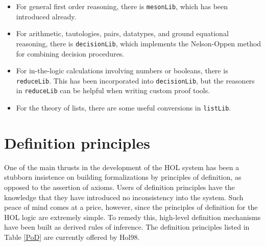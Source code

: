 \documentclass[12pt,fleqn,a4paper]{report}
\begin{document}
\begin{itemize}

\item For general first order reasoning, there is \verb+mesonLib+, which
      has been introduced already.

\item For arithmetic, tautologies, pairs, datatypes, and ground
      equational reasoning, there is \verb+decisionLib+, which
      implements the Nelson-Oppen method for combining decision procedures.

\item For in-the-logic calculations involving numbers or booleans, there
      is \verb+reduceLib+. This has been incorporated into
      \verb+decisionLib+, but the reasoners in \verb+reduceLib+ can be
      helpful when writing custom proof tools.

\item For the theory of lists, there are some useful conversions in
      \verb+listLib+.
\end{itemize}


\section{Definition principles}

One of the main thrusts in the development of the HOL system has been a
stubborn insistence on building formalizations by principles of
definition, as opposed to the assertion of axioms. Users of definition
principles have the knowledge that they have introduced no inconsistency
into the system.  Such peace of mind comes at a price, however, since
the principles of definition for the HOL logic are extremely simple. To
remedy this, high-level definition mechanisms have been built as derived
rules of inference. The definition principles listed in Table \ref{PoD}
are currently offered by Hol98.
\end{document}
